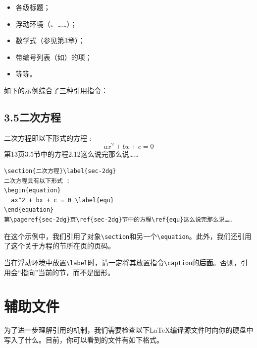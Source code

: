 \begin{itemize}
  \item 各级标题；
  \item 浮动环境（、……）；
  \item 数学式（参见第3章）；
  \item 带编号列表（如）的项；
  \item 等等。
\end{itemize}

如下的示例综合了三种引用指令：

\begin{codelist}[2.21]{
  \section*{3.5\quad 二次方程}
二次方程即以下形式的方程 :
\begin{equation}
  ax^2 + bx + c = 0 \tag{2.12}
\end{equation}
第13页3.5节中的方程2.12这么说完那么说……
}\begin{verbatim}
\section{二次方程}\label{sec-2dg}
二次方程具有以下形式 :
\begin{equation}
  ax^2 + bx + c = 0 \label{equ}
\end{equation}
第\pageref{sec-2dg}页\ref{sec-2dg}节中的方程\ref{equ}这么说完那么说……
\end{verbatim}
\end{codelist}

在这个示例中，我们引用了对象\verb|\section|和另一个\verb|\equation|。此外，我们还引用了这个关于方程的节所在页的页码。

\begin{exclamation}
当在浮动环境中放置\verb|\label|时，请一定将其放置指令\verb|\caption|的\textbf{后面}。否则，引用会“指向”当前的节，而不是图形。
\end{exclamation}

\section{辅助文件}

为了进一步理解引用的机制，我们需要检查以下\LaTeX 编译源文件时向你的硬盘中写入了什么。目前，你可以看到的文件有如下格式。

